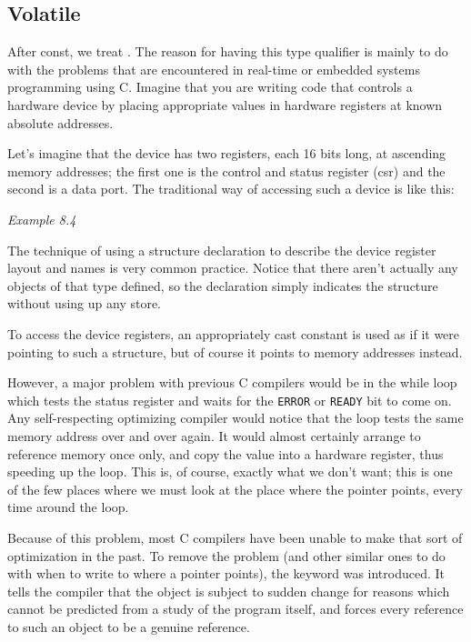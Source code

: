   

  \subsection{Volatile}
   

   After const, we treat \volatile. The reason for having
    this type qualifier is mainly to do with the problems that are
    encountered in real-time or embedded systems programming using C.
    Imagine that you are writing code that controls a hardware device by
    placing appropriate values in hardware registers at known absolute
    addresses.


   Let's imagine that the device has two registers, each 16 bits long, at
    ascending memory addresses; the first one is the control and status
    register (csr) and the second is a data port. The traditional way of
    accessing such a device is like this:


    \begin{center}\textit{Example 8.4}\end{center}


   The technique of using a structure declaration to describe the device
    register layout and names is very common practice. Notice that there
    aren't actually any objects of that type defined, so the declaration
    simply indicates the structure without using up any store.


   To access the device registers, an appropriately cast constant is used
    as if it were pointing to such a structure, but of course it points to
    memory addresses instead.


   However, a major problem with previous C compilers would be in the
    while loop which tests the status register and waits for the
    \texttt{ERROR} or \texttt{READY} bit to come on. Any
    self-respecting optimizing compiler would notice that the loop tests the
    same memory address over and over again. It would almost certainly
    arrange to reference memory once only, and copy the value into
    a hardware register, thus speeding up the loop. This is, of course,
    exactly what we don't want; this is one of the few places where we must
    look at the place where the pointer points, every time around the
    loop.


   Because of this problem, most C compilers have been unable to make
    that sort of optimization in the past. To remove the problem (and other
    similar ones to do with when to write to where a pointer points), the
    keyword \volatile{} was introduced. It tells the compiler that
    the object is subject to sudden change for reasons which cannot be
    predicted from a study of the program itself, and forces every reference
    to such an object to be a genuine reference.


